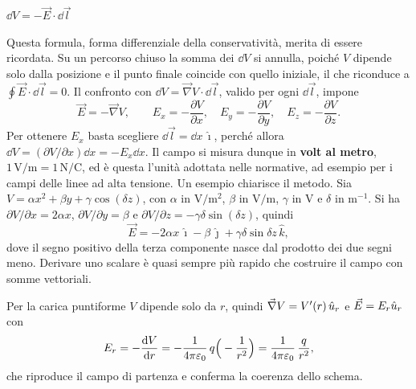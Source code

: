 \documentclass[11pt,a4paper]{article}
\begin{document}
\begin{center}
	\begin{tcolorbox}[colback=blue!5!white, colframe=blue!75!black, halign=center, width=0.55\textwidth, boxrule=1pt, arc=4pt]
		\Large
		$\displaystyle \dd V=-\vec E\cdot\dd\vec l$
	\end{tcolorbox}
\end{center}
Questa formula, forma differenziale della conservatività, merita di essere ricordata. Su un percorso chiuso la somma dei $\dd V$ si annulla, poiché $V$ dipende solo dalla posizione e il punto finale coincide con quello iniziale, il che riconduce a $\oint\vec E\cdot\dd\vec l=0$. Il confronto con $\dd V=\vec \nabla V\cdot\dd\vec l$, valido per ogni $\dd\vec l$, impone
\[
\vec E=-\vec \nabla V ,\qquad
E_x=-\frac{\partial V}{\partial x},\quad E_y=-\frac{\partial V}{\partial y},\quad E_z=-\frac{\partial V}{\partial z}.
\]
Per ottenere $E_x$ basta scegliere $\dd\vec l=\dd x\,\hat\imath$, perché allora $\dd V=(\partial V/\partial x)\dd x=-E_x\dd x$. Il campo si misura dunque in \textbf{volt al metro}, $\ensuremath{1\,\mathrm{V/m}}=\ensuremath{1\,\mathrm{N/C}}$, ed è questa l'unità adottata nelle normative, ad esempio per i campi delle linee ad alta tensione. Un esempio chiarisce il metodo. Sia $V=\alpha x^2+\beta y+\gamma\cos(\delta z)$, con $\alpha$ in $\ensuremath{\mathrm{V/m^2}}$, $\beta$ in $\ensuremath{\mathrm{V/m}}$, $\gamma$ in $\ensuremath{\mathrm{V}}$ e $\delta$ in $\ensuremath{\mathrm{m^{-1}}}$. Si ha $\partial V/\partial x=2\alpha x$, $\partial V/\partial y=\beta$ e $\partial V/\partial z=-\gamma\delta\sin(\delta z)$, quindi
\[
\vec E=-2\alpha x\,\hat\imath-\beta\,\hat\jmath+\gamma \delta\sin \delta z\,\hat k ,
\]
dove il segno positivo della terza componente nasce dal prodotto dei due segni meno. Derivare uno scalare è quasi sempre più rapido che costruire il campo con somme vettoriali.

Per la carica puntiforme $V$ dipende solo da $r$, quindi $\vec \nabla V=V'(r)\,\hat{u}_r$ e $\vec E=E_r\hat{u}_r$ con
\[
E_r=-\frac{\mathrm{d} V}{\mathrm{d} r}=-\frac{1}{4\pi\varepsilon_0}\,q\Big(-\frac1{r^2}\Big)=\frac{1}{4\pi\varepsilon_0}\,\frac{q}{r^2},
\]
che riproduce il campo di partenza e conferma la coerenza dello schema.
\end{document}
